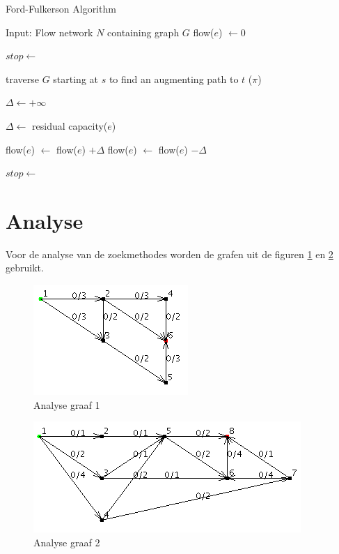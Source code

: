\begin{algorithm}[h]
\caption{Ford-Fulkerson Algorithm}
\label{alg:FordFulkerson}
\begin{algorithmic}
\REQUIRE Input: Flow network $N$ containing graph $G$
 \STATE flow($e$) $\gets 0$
\ENDFOR

\STATE $stop \gets$ \FALSE

\REPEAT
\STATE traverse $G$ starting at $s$ to find an augmenting path to $t$ ($\pi$)


\STATE $\Delta \gets +\infty$

\STATE $\Delta \gets $ residual capacity($e$)
\ENDIF
\ENDFOR


\STATE flow($e$) $\gets $ flow($e$) $+ \Delta$
\ELSE
\STATE flow($e$) $\gets $ flow($e$) $- \Delta$
\ENDIF

\ENDFOR

\ELSE
\STATE $stop \gets$ \TRUE
\ENDIF
{}

\end{algorithmic}
\end{algorithm}

\section{Analyse}

Voor de analyse van de zoekmethodes worden de grafen uit de figuren \ref{fig:analyseGraaf1} en \ref{fig:analyseGraaf2} gebruikt.
\begin{figure}[h]
\includegraphics[width=\linewidth]{maxflowproblem/graph1}
\centering
\caption{Analyse graaf 1}
\label{fig:analyseGraaf1}
\end{figure}

\begin{figure}[h]
 \includegraphics[width=\linewidth]{maxflowproblem/graph2}
\centering
\caption{Analyse graaf 2}
\label{fig:analyseGraaf2}
\end{figure}
